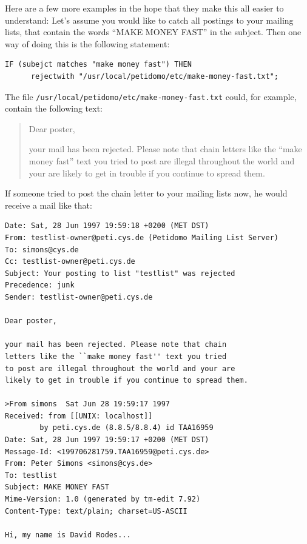 \documentclass[a4paper]{report}
\newcommand{\file}[1]{{\tt #1}}
\begin{document}
Here are a few more examples in the hope that they make this all
easier to understand: Let's assume you would like to catch all
postings to your mailing lists, that contain the words ``MAKE MONEY
FAST'' in the subject. Then one way of doing this is the following
statement:
\begin{verbatim}
IF (subejct matches "make money fast") THEN
      rejectwith "/usr/local/petidomo/etc/make-money-fast.txt";
\end{verbatim}

The file \file{/usr/local/petidomo/etc/make-money-fast.txt} could, for
example, contain the following text:
\begin{quotation}
Dear poster,

your mail has been rejected. Please note that chain letters like the
``make money fast'' text you tried to post are illegal throughout the
world and your are likely to get in trouble if you continue to spread
them.
\end{quotation}

If someone tried to post the chain letter to your mailing lists now,
he would receive a mail like that:
\begin{verbatim}
Date: Sat, 28 Jun 1997 19:59:18 +0200 (MET DST)
From: testlist-owner@peti.cys.de (Petidomo Mailing List Server)
To: simons@cys.de
Cc: testlist-owner@peti.cys.de
Subject: Your posting to list "testlist" was rejected
Precedence: junk
Sender: testlist-owner@peti.cys.de

Dear poster,

your mail has been rejected. Please note that chain
letters like the ``make money fast'' text you tried
to post are illegal throughout the world and your are
likely to get in trouble if you continue to spread them.

>From simons  Sat Jun 28 19:59:17 1997
Received: from [[UNIX: localhost]]
        by peti.cys.de (8.8.5/8.8.4) id TAA16959
Date: Sat, 28 Jun 1997 19:59:17 +0200 (MET DST)
Message-Id: <199706281759.TAA16959@peti.cys.de>
From: Peter Simons <simons@cys.de>
To: testlist
Subject: MAKE MONEY FAST
Mime-Version: 1.0 (generated by tm-edit 7.92)
Content-Type: text/plain; charset=US-ASCII

Hi, my name is David Rodes...
\end{verbatim}
\end{document}
